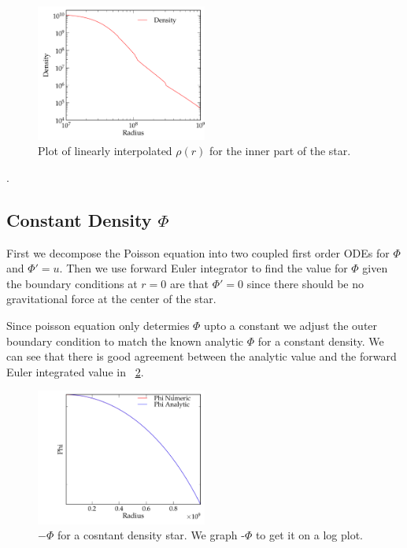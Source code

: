 \documentclass[11pt,letterpaper]{article}
\begin{document}
\begin{figure}[bth]
\centering
\includegraphics[width=0.5\textwidth]{2.pdf}
\caption{Plot of linearly interpolated $\rho(r)$ for the inner part of the star.}
\label{fig:rhor_interp}
\end{figure}.

\subsection{Constant Density $\Phi$}

First we decompose the Poisson equation into two coupled first order ODEs for
$\Phi$ and $\Phi' = u$. Then we use forward Euler integrator to find the value 
for $\Phi$ given the boundary conditions at $r=0$ are that $\Phi' = 0$ since 
there should be no gravitational force at the center of the star. 

Since poisson equation only determies $\Phi$ upto a constant we adjust the outer
boundary condition to match the known analytic $\Phi$ for a constant density. We
can see that there is good agreement between the analytic value and the forward
Euler integrated value in ~\ref{fig:phi_const_rho}. 

\begin{figure}[bth]
\centering
\includegraphics[width=0.5\textwidth]{3a.pdf}
\caption{$-\Phi$ for a cosntant density star. We graph -$\Phi$ to get it on a 
log plot.}
\label{fig:phi_const_rho}
\end{figure}
\end{document}
